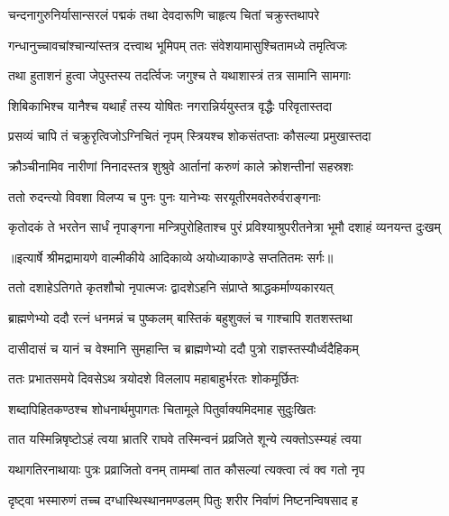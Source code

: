 \twolineshloka
{चन्दनागुरुनिर्यासान्सरलं पद्मकं तथा}
{देवदारूणि चाहृत्य चितां चक्रुस्तथापरे} %

\twolineshloka
{गन्धानुच्चावचांश्चान्यांस्तत्र दत्त्वाथ भूमिपम्}
{ततः संवेशयामासुश्चितामध्ये तमृत्विजः} %

\twolineshloka
{तथा हुताशनं हुत्वा जेपुस्तस्य तदर्त्विजः}
{जगुश्च ते यथाशास्त्रं तत्र सामानि सामगाः} %

\twolineshloka
{शिबिकाभिश्च यानैश्च यथार्हं तस्य योषितः}
{नगरान्निर्ययुस्तत्र वृद्धैः परिवृतास्तदा} %

\twolineshloka
{प्रसव्यं चापि तं चक्रुरृत्विजोऽग्निचितं नृपम्}
{स्त्रियश्च शोकसंतप्ताः कौसल्या प्रमुखास्तदा} %

\twolineshloka
{क्रौञ्चीनामिव नारीणां निनादस्तत्र शुश्रुवे}
{आर्तानां करुणं काले क्रोशन्तीनां सहस्रशः} %

\twolineshloka
{ततो रुदन्त्यो विवशा विलप्य च पुनः पुनः}
{यानेभ्यः सरयूतीरमवतेरुर्वराङ्गनाः} %

\fourlineindentedshloka
{कृतोदकं ते भरतेन सार्धं}
{ नृपाङ्गना मन्त्रिपुरोहिताश्च}
{पुरं प्रविश्याश्रुपरीतनेत्रा}
{ भूमौ दशाहं व्यनयन्त दुःखम्} %


{॥इत्यार्षे श्रीमद्रामायणे वाल्मीकीये आदिकाव्ये अयोध्याकाण्डे सप्ततितमः सर्गः॥}


\twolineshloka
{ततो दशाहेऽतिगते कृतशौचो नृपात्मजः}
{द्वादशेऽहनि संप्राप्ते श्राद्धकर्माण्यकारयत्} %

\twolineshloka
{ब्राह्मणेभ्यो ददौ रत्नं धनमन्नं च पुष्कलम्}
{बास्तिकं बहुशुक्लं च गाश्चापि शतशस्तथा} %

\twolineshloka
{दासीदासं च यानं च वेश्मानि सुमहान्ति च}
{ब्राह्मणेभ्यो ददौ पुत्रो राज्ञस्तस्यौर्ध्वदैहिकम्} %

\twolineshloka
{ततः प्रभातसमये दिवसेऽथ त्रयोदशे}
{विललाप महाबाहुर्भरतः शोकमूर्छितः} %

\twolineshloka
{शब्दापिहितकण्ठश्च शोधनार्थमुपागतः}
{चितामूले पितुर्वाक्यमिदमाह सुदुःखितः} %

\twolineshloka
{तात यस्मिन्निषृष्टोऽहं त्वया भ्रातरि राघवे}
{तस्मिन्वनं प्रव्रजिते शून्ये त्यक्तोऽस्म्यहं त्वया} %

\twolineshloka
{यथागतिरनाथायाः पुत्रः प्रव्राजितो वनम्}
{तामम्बां तात कौसल्यां त्यक्त्वा त्वं क्व गतो नृप} %

\twolineshloka
{दृष्ट्वा भस्मारुणं तच्च दग्धास्थिस्थानमण्डलम्}
{पितुः शरीर निर्वाणं निष्टनन्विषसाद ह} %

